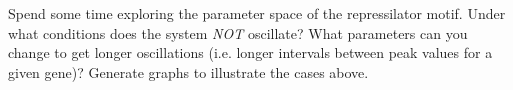 \medskip
\begin{assignment}
Spend some time exploring the parameter space of the repressilator motif.  Under what conditions does the system \emph{NOT} oscillate?  What parameters can you change to get longer oscillations (i.e. longer intervals between peak values for a given gene)?  Generate graphs to illustrate the cases above.
\end{assignment}